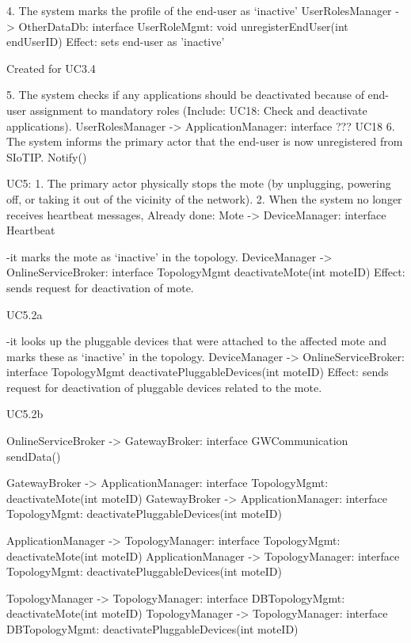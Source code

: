         4. The system marks the profile of the end-user as `inactive'
            UserRolesManager -> OtherDataDb: interface UserRoleMgmt:
                                                void unregisterEndUser(int endUserID)
            Effect: sets end-user as 'inactive'
            \item Created for UC3.4

        5. The system checks if any applications should be deactivated because of end-user assignment
            to mandatory roles (Include: UC18: Check and deactivate applications).
            UserRolesManager -> ApplicationManager: interface ??? UC18
        6. The system informs the primary actor that the end-user is now unregistered from SIoTIP.
            Notify()

    UC5:
        1. The primary actor physically stops the mote (by unplugging, powering off, or taking it out of
            the vicinity of the network).
        2. When the system no longer receives heartbeat messages,
            Already done: Mote -> DeviceManager: interface Heartbeat

            -it marks the mote as `inactive' in the topology.
            DeviceManager -> OnlineServiceBroker: interface TopologyMgmt deactivateMote(int moteID)
            Effect: sends request for deactivation of mote.
            \item UC5.2a

            -it looks up the pluggable devices that were attached to the affected mote and marks these
                as `inactive' in the topology.
            DeviceManager -> OnlineServiceBroker: interface TopologyMgmt deactivatePluggableDevices(int moteID)
            Effect: sends request for deactivation of pluggable devices related to the mote.
            \item UC5.2b

            OnlineServiceBroker -> GatewayBroker: interface GWCommunication
            sendData()

            GatewayBroker -> ApplicationManager: interface TopologyMgmt: deactivateMote(int moteID)
            GatewayBroker -> ApplicationManager: interface TopologyMgmt: deactivatePluggableDevices(int moteID)

            ApplicationManager -> TopologyManager: interface TopologyMgmt: deactivateMote(int moteID)
            ApplicationManager -> TopologyManager: interface TopologyMgmt: deactivatePluggableDevices(int moteID)

            TopologyManager -> TopologyManager: interface DBTopologyMgmt: deactivateMote(int moteID)
            TopologyManager -> TopologyManager: interface DBTopologyMgmt: deactivatePluggableDevices(int moteID)

